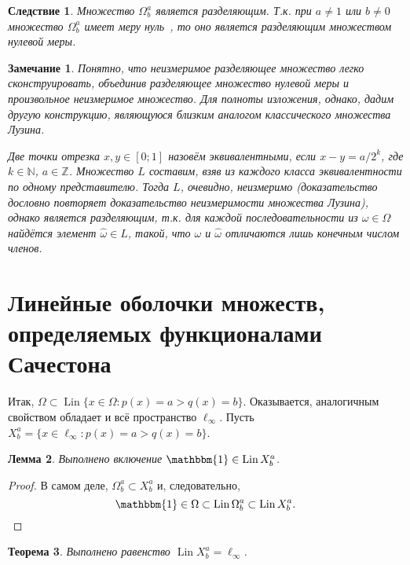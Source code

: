 \documentclass[a4paper,14pt]{article} %
\theoremstyle{plain}
\newtheorem{lemma}{Лемма}[section]
\newtheorem{theorem}[lemma]{Теорема}
\newtheorem{remark}[lemma]{Замечание}
\newtheorem{corollary}{Следствие}[lemma]
\begin{document}
\begin{corollary}
	Множество $\Omega^a_b$ является разделяющим.
	Т.к. при $a\neq 1$ или $b\neq 0$ множество $\Omega^a_b$ имеет меру нуль~\cite{semenov2010characteristic},
	то оно является разделяющим множеством нулевой меры.
\end{corollary}

\begin{remark}
	Понятно, что неизмеримое разделяющее множество легко сконструировать,
	объединив разделяющее множество нулевой меры и произвольное неизмеримое множество.
	Для полноты изложения, однако, дадим другую конструкцию, являющуюся близким аналогом классического множества Лузина.

	Две точки отрезка $x,y \in [0;1]$ назовём эквивалентными, если
	$x - y = a/2^k$, где $k\in\mathbb{N}$, $a\in\mathbb{Z}$.
	Множество $L$ составим, взяв из каждого класса эквивалентности по одному представителю.
	Тогда $L$, очевидно, неизмеримо (доказательство дословно повторяет доказательство неизмеримости множества Лузина),
	однако является разделяющим, т.к. для каждой последовательности из $\omega\in\Omega$
	найдётся элемент $\hat\omega\in L$, такой, что $\omega$ и $\hat\omega$ отличаются лишь конечным числом членов.
\end{remark}


\section{Линейные оболочки множеств, определяемых функционалами Сачестона}

Итак, $\Omega \subset \operatorname{Lin}\{x\in\Omega : p(x) = a > q(x) = b\}$.
Оказывается, аналогичным свойством обладает и всё пространство $\ell_\infty$.
Пусть $X^a_b = \{x\in\ell_\infty : p(x) = a > q(x) = b\}$.

\begin{lemma}
	\label{lem:const_Lin_ell_infty}
	Выполнено включение
	$\mathbbm{1}\in \operatorname{Lin} X^a_b$.
\end{lemma}

\begin{proof}
	В самом деле,
	$\Omega^a_b \subset X^a_b$
	и, следовательно,
	\begin{equation}
		\mathbbm{1} \in \Omega \subset \operatorname{Lin} \Omega^a_b \subset \operatorname{Lin} X^a_b
		.
	\end{equation}
\end{proof}

\begin{theorem}
	\label{thm:Lin_ell_infty}
	Выполнено равенство $\operatorname{Lin} X^a_b = \ell_\infty$.
\end{theorem}
\end{document}
